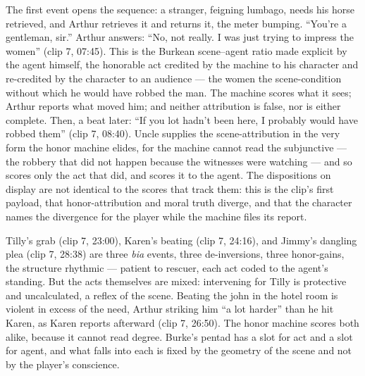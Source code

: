 \documentclass{article}
\begin{document}
The first event opens the sequence: a stranger, feigning lumbago, needs his horse retrieved, and Arthur retrieves it and returns it, the meter bumping. ``You're a gentleman, sir.'' Arthur answers: ``No, not really. I was just trying to impress the women'' (clip 7, 07:45). This is the Burkean scene–agent ratio made explicit by the agent himself, the honorable act credited by the machine to his character and re-credited by the character to an audience — the women the scene-condition without which he would have robbed the man. The machine scores what it sees; Arthur reports what moved him; and neither attribution is false, nor is either complete. Then, a beat later: ``If you lot hadn't been here, I probably would have robbed them'' (clip 7, 08:40). Uncle supplies the scene-attribution in the very form the honor machine elides, for the machine cannot read the subjunctive — the robbery that did not happen because the witnesses were watching — and so scores only the act that did, and scores it to the agent. The dispositions on display are not identical to the scores that track them: this is the clip's first payload, that honor-attribution and moral truth diverge, and that the character names the divergence for the player while the machine files its report.

Tilly's grab (clip 7, 23:00), Karen's beating (clip 7, 24:16), and Jimmy's dangling plea (clip 7, 28:38) are three \textit{bia} events, three de-inversions, three honor-gains, the structure rhythmic — patient to rescuer, each act coded to the agent's standing. But the acts themselves are mixed: intervening for Tilly is protective and uncalculated, a reflex of the scene. Beating the john in the hotel room is violent in excess of the need, Arthur striking him ``a lot harder'' than he hit Karen, as Karen reports afterward (clip 7, 26:50). The honor machine scores both alike, because it cannot read degree. Burke's pentad has a slot for act and a slot for agent, and what falls into each is fixed by the geometry of the scene and not by the player's conscience.
\end{document}
